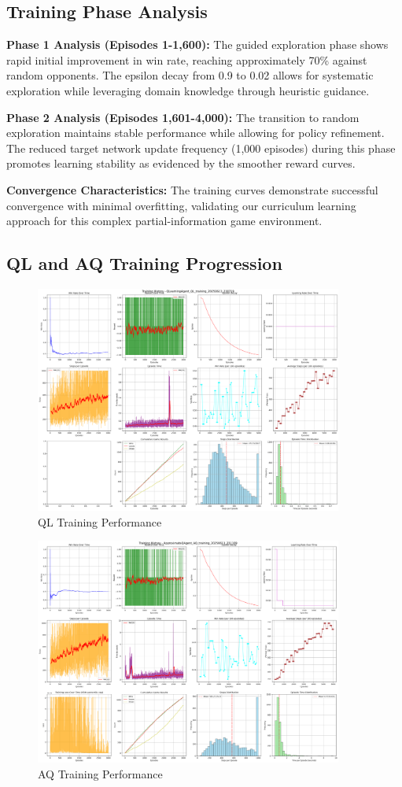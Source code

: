 \documentclass{article}
\begin{document}
\subsection{Training Phase Analysis}

\textbf{Phase 1 Analysis (Episodes 1-1,600):} The guided exploration phase shows rapid initial improvement in win rate, reaching approximately 70\% against random opponents. The epsilon decay from 0.9 to 0.02 allows for systematic exploration while leveraging domain knowledge through heuristic guidance.

\textbf{Phase 2 Analysis (Episodes 1,601-4,000):} The transition to random exploration maintains stable performance while allowing for policy refinement. The reduced target network update frequency (1,000 episodes) during this phase promotes learning stability as evidenced by the smoother reward curves.

\textbf{Convergence Characteristics:} The training curves demonstrate successful convergence with minimal overfitting, validating our curriculum learning approach for this complex partial-information game environment.


\subsection{QL and AQ Training Progression}

\begin{figure}[H]
    \centering
    \includegraphics[width=0.9\textwidth]{QLAgent_training_plots.png}
    \caption{QL Training Performance}
    \label{fig:ql_training_curves}
\end{figure}

\begin{figure}[H]
    \centering
    \includegraphics[width=0.9\textwidth]{AQAgent_training_plots.png}
    \caption{AQ Training Performance}
    \label{fig:aq_training_curves}
\end{figure}
\end{document}
